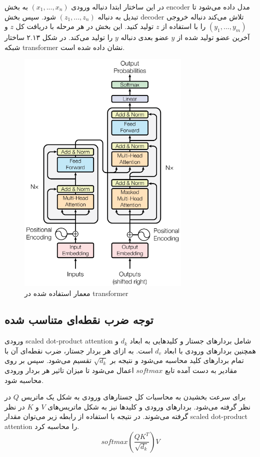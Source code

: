 در این ساختار ابتدا دنباله ورودی $(x_1, ..., x_n)$ به بخش \gls{encoder} مدل داده
می‌شود تا تبدیل به دنباله $(z_1, ..., z_n)$ شود. سپس بخش \gls{decoder} تلاش
می‌کند دنباله خروجی $(y_1, ..., y_m)$ را با استفاده از $z$ تولید کنید. این بخش
در هر مرحله با دریافت کل $z$ و آخرین عضو تولید شده از $y$ عضو بعدی دنباله $y$ را
تولید می‌کند. در شکل ۲.۱۳ ساختار شبکه \gls{transformer} نشان داده شده است.
\begin{figure}[ht]
    \centering
    \includegraphics[height=12cm]{./statics/transformers_architecture.png}
    \caption{معمار استفاده شده در \gls{transformer}}
\end{figure}

\subsection{توجه ضرب نقطه‌ای متناسب شده}
ورودی \gls{scaled dot-product attention} شامل بردارهای جستار و کلیدهایی به ابعاد
$d_k$ و همچنین بردارهای ورودی با ابعاد $d_v$ است. به ازای هر بردار جستار، ضرب
نقطه‌ای آن با تمام بردارهای کلید محاسبه می‌شود و نتیجه بر $\sqrt{d_k}$ تقسیم
می‌شود. سپس بر روی مقادیر به دست آمده تابع $softmax$ اعمال می‌شود تا میزان تاثیر
هر بردار ورودی محاسبه شود.

برای سرعت بخشیدن به محاسبات کل جستارهای ورودی به شکل یک ماتریس $Q$ در نظر گرفته
می‌شود. بردارهای ورودی و کلیدها نیز به شکل ماتریس‌های $V$ و $K$ در نظر گرفته
می‌شوند. در نتیجه با استفاده از رابطه زیر می‌توان مقدار \gls{scaled dot-product
attention} را محاسبه کرد.
\begin{equation}
    softmax(\frac{QK^T}{\sqrt{d_k}})V
\end{equation}

